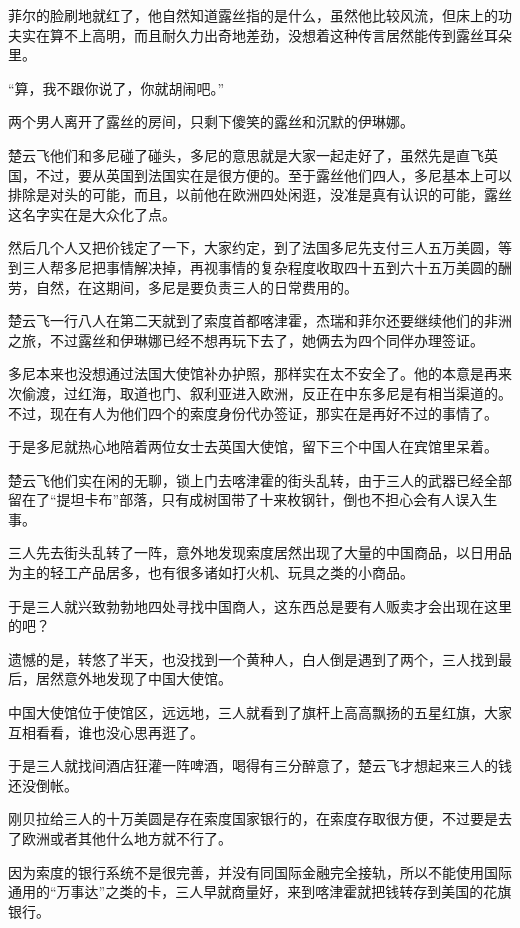 菲尔的脸刷地就红了，他自然知道露丝指的是什么，虽然他比较风流，但床上的功夫实在算不上高明，而且耐久力出奇地差劲，没想着这种传言居然能传到露丝耳朵里。

“算，我不跟你说了，你就胡闹吧。”

两个男人离开了露丝的房间，只剩下傻笑的露丝和沉默的伊琳娜。

楚云飞他们和多尼碰了碰头，多尼的意思就是大家一起走好了，虽然先是直飞英国，不过，要从英国到法国实在是很方便的。至于露丝他们四人，多尼基本上可以排除是对头的可能，而且，以前他在欧洲四处闲逛，没准是真有认识的可能，露丝这名字实在是大众化了点。

然后几个人又把价钱定了一下，大家约定，到了法国多尼先支付三人五万美圆，等到三人帮多尼把事情解决掉，再视事情的复杂程度收取四十五到六十五万美圆的酬劳，自然，在这期间，多尼是要负责三人的日常费用的。

楚云飞一行八人在第二天就到了索度首都喀津霍，杰瑞和菲尔还要继续他们的非洲之旅，不过露丝和伊琳娜已经不想再玩下去了，她俩去为四个同伴办理签证。

多尼本来也没想通过法国大使馆补办护照，那样实在太不安全了。他的本意是再来次偷渡，过红海，取道也门、叙利亚进入欧洲，反正在中东多尼是有相当渠道的。不过，现在有人为他们四个的索度身份代办签证，那实在是再好不过的事情了。

于是多尼就热心地陪着两位女士去英国大使馆，留下三个中国人在宾馆里呆着。

楚云飞他们实在闲的无聊，锁上门去喀津霍的街头乱转，由于三人的武器已经全部留在了“提坦卡布”部落，只有成树国带了十来枚钢针，倒也不担心会有人误入生事。

三人先去街头乱转了一阵，意外地发现索度居然出现了大量的中国商品，以日用品为主的轻工产品居多，也有很多诸如打火机、玩具之类的小商品。

于是三人就兴致勃勃地四处寻找中国商人，这东西总是要有人贩卖才会出现在这里的吧？

遗憾的是，转悠了半天，也没找到一个黄种人，白人倒是遇到了两个，三人找到最后，居然意外地发现了中国大使馆。

中国大使馆位于使馆区，远远地，三人就看到了旗杆上高高飘扬的五星红旗，大家互相看看，谁也没心思再逛了。

于是三人就找间酒店狂灌一阵啤酒，喝得有三分醉意了，楚云飞才想起来三人的钱还没倒帐。

刚贝拉给三人的十万美圆是存在索度国家银行的，在索度存取很方便，不过要是去了欧洲或者其他什么地方就不行了。

因为索度的银行系统不是很完善，并没有同国际金融完全接轨，所以不能使用国际通用的“万事达”之类的卡，三人早就商量好，来到喀津霍就把钱转存到美国的花旗银行。

